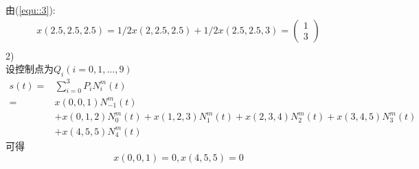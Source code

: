 \documentclass{article}
\begin{document}
	由(\ref{equ::3}):
	\begin{equation}\label{equ::4}
		\begin{aligned}
			x(2.5,2.5,2.5)=1/2x(2,2.5,2.5)+1/2x(2.5,2.5,3)=\left(\begin{array}{c} 1\\3 \end{array}\right)\\
		\end{aligned}
	\end{equation}
	2)\\
	设控制点为$Q_i(i=0,1,\dots,9)$\\
	$$\begin{aligned}
		s(t)=&\sum_{i=0}^{3}P_iN_i^m(t)\\
		=&x(0,0,1)N_{-1}^m(t)\\
		&+x(0,1,2)N_0^m(t)+x(1,2,3)N_1^m(t)+x(2,3,4)N_2^m(t)+x(3,4,5)N_3^m(t)\\
		&+x(4,5,5)N_4^m(t)
	\end{aligned}$$
	可得$$x(0,0,1)=0,x(4,5,5)=0$$
\end{document}

